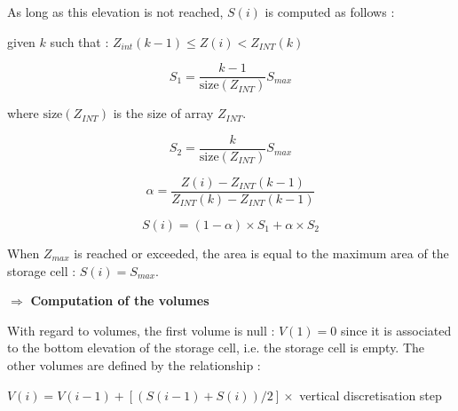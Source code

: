 \vspace{0.5cm}

As long as this elevation is not reached, $S(i)$ is computed as follows :

\vspace{0.5cm}

given $k$ such that : $Z_{int}(k-1) \leq Z(i) < Z_{INT}(k)$

\begin{equation}
  S_1 = \frac{k-1}{\mbox{size}(Z_{INT})}S_{max}
\end{equation}

where $\mbox{size}(Z_{INT})$ is the size of array $Z_{INT}$.

\begin{equation}
  S_2 = \frac{k}{\mbox{size}(Z_{INT})}S_{max}
\end{equation}

\begin{equation}
  \alpha = \frac{Z(i)-Z_{INT}(k-1)}{Z_{INT}(k)-Z_{INT}(k-1)}
\end{equation}

\begin{equation}
  S(i) = (1-\alpha) \times S_1 + \alpha \times S_2
\end{equation}

\vspace{0.5cm}

When $Z_{max}$ is reached or exceeded, the area is equal to the maximum area of the storage cell : $S(i) = S_{max}$.

\vspace{0.5cm}

$\Longrightarrow$ \textbf{Computation of the volumes}

\vspace{0.5cm}

With regard to volumes, the first volume is null : $V(1) = 0$ since it is associated to the bottom elevation of the storage cell, i.e. the storage cell is empty.
The other volumes are defined by the relationship :

\vspace{0.5cm}

$V(i) = V(i-1) + [(S(i-1) + S(i)) / 2] \times$ vertical discretisation step


